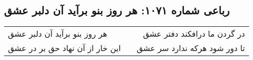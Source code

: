 \begin{center}
\section*{رباعی شماره ۱۰۷۱: هر روز بنو برآید آن دلبر عشق}
\label{sec:1071}
\begin{longtable}{l p{0.5cm} r}
هر روز بنو برآید آن دلبر عشق
&&
در گردن ما درافکند دفتر عشق
\\
این خار از آن نهاد حق بر در عشق
&&
تا دور شود هرکه ندارد سر عشق
\\
\end{longtable}
\end{center}
